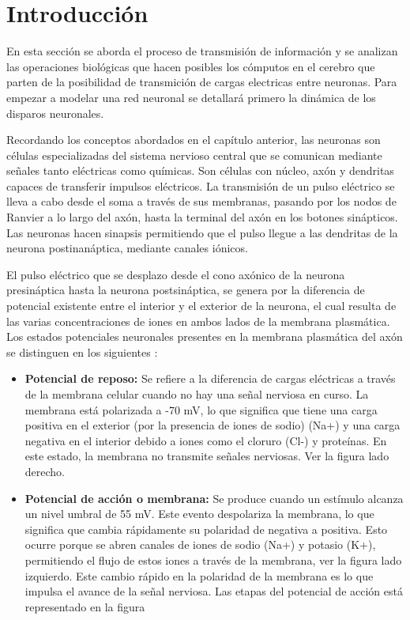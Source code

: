 
\section{Introducción}

En esta sección se aborda el proceso de transmisión de información y se analizan las operaciones biológicas que hacen posibles los cómputos en el cerebro que parten de la posibilidad de transmición de cargas electricas entre neuronas. Para empezar a modelar una red neuronal se detallará primero la dinámica de los disparos neuronales.

Recordando los conceptos abordados en el  capítulo  anterior, las neuronas son células especializadas del sistema nervioso central que se comunican mediante señales tanto eléctricas como químicas.  Son células con núcleo, axón y dendritas capaces de transferir impulsos eléctricos. La transmisión de un pulso eléctrico se lleva a cabo desde el soma a través de sus membranas, pasando por los nodos de Ranvier a lo largo del axón, hasta la terminal del axón en los botones sinápticos. Las neuronas hacen sinapsis  permitiendo que el pulso llegue a las dendritas de la neurona postinanáptica, mediante canales iónicos. \parencite{neurona_A_cerebro}

El pulso eléctrico que se desplazo desde el cono axónico de la neurona presináptica hasta la neurona postsináptica, se genera por la diferencia de potencial existente entre el interior y el exterior de la neurona, el cual resulta de las varias concentraciones de iones en ambos lados de la membrana plasmática. Los estados potenciales neuronales presentes en la membrana plasmática del axón se distinguen en los siguientes \parencite{HH}:

\begin{itemize}
\item \textbf{Potencial de reposo:} Se refiere a la diferencia de cargas eléctricas a través de la membrana celular cuando no hay una señal nerviosa en curso. La membrana está polarizada a -70 mV, lo que significa que tiene una carga positiva en el exterior (por la presencia de iones de sodio) (Na+) y una carga negativa en el interior debido a iones como el cloruro (Cl-) y proteínas. En este estado, la membrana no transmite señales nerviosas. Ver la figura  lado derecho.

\item \textbf{Potencial de acción o membrana:}  Se produce cuando un estímulo alcanza un nivel umbral de 55 mV. Este evento despolariza la membrana, lo que significa que cambia rápidamente su polaridad de negativa a positiva. Esto ocurre porque se abren canales de iones de sodio (Na+) y potasio (K+), permitiendo el flujo de estos iones a través de la membrana, ver la figura  lado izquierdo. Este cambio rápido en la polaridad de la membrana es lo que impulsa el avance de la señal nerviosa. Las etapas del potencial de acción está representado en la figura 
\end{itemize}


